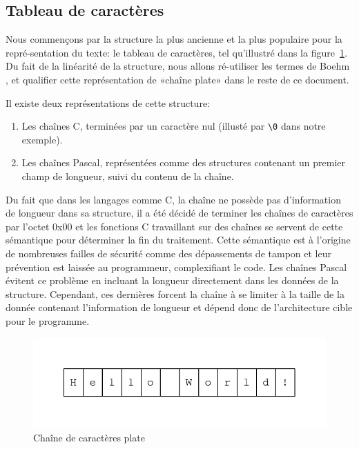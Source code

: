 \subsection{Tableau de caractères}\label{state_flatstr_prez}

Nous commençons par la structure la plus ancienne et la plus populaire pour la
repré-sentation du texte: le tableau de caractères, tel qu'illustré dans la figure~\ref{flatexample}.
Du fait de la linéarité de la structure, nous allons ré-utiliser les termes de
Boehm \cite{Boehm95}, et qualifier cette représentation de «chaîne plate» dans le reste
de ce document.

Il existe deux représentations de cette structure:
\begin{enumerate}
	\item Les chaînes C, terminées par un caractère nul (illusté par \texttt{\textbackslash0} dans notre exemple).
	\item Les chaînes Pascal, représentées comme des structures contenant un premier champ de longueur, suivi du contenu de la chaîne.
\end{enumerate}

Du fait que dans les langages comme C, la chaîne ne possède pas d'information de longueur dans sa
structure, il a été décidé de terminer les chaînes de caractères par l'octet 0x00 et les fonctions
C travaillant sur des chaînes se servent de cette sémantique pour déterminer
la fin du traitement.
Cette sémantique est à l'origine de nombreuses failles de sécurité comme des dépassements
de tampon et leur prévention est laissée au programmeur, complexifiant le code.
Les chaînes Pascal évitent ce problème en incluant la longueur directement dans les données de la structure.
Cependant, ces dernières forcent la chaîne à se limiter à la taille de la donnée contenant
l'information de longueur et dépend donc de l'architecture cible pour le programme.

\begin{figure}
	\caption{Chaîne de caractères plate}
	\label{flatexample}
	\centering
	\includegraphics{figures/flat.pdf}
\end{figure}

